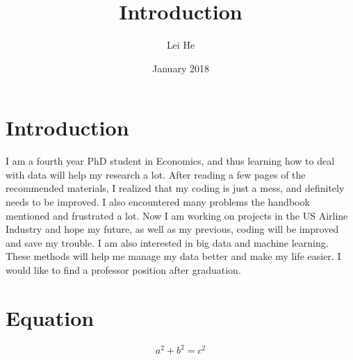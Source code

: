 \documentclass{article}
\title{Introduction}
\author{Lei He }
\date{January 2018}
\begin{document}
\maketitle

\section{Introduction}
I am a fourth year PhD student in Economics, and thus learning how to deal with data will help my research a lot. After reading a few pages of the recommended materials, I realized that my coding is just a mess, and definitely needs to be improved. I also encountered many problems the handbook mentioned and frustrated a lot. Now I am working on projects in the US Airline Industry and hope my future, as well as my previous, coding will be improved and save my trouble. I am also interested in big data and machine learning. These methods will help me manage my data better and make my life easier. I would like to find a professor position after graduation.

\section{Equation}
\begin{equation}
    a^2+b^2=c^2
\end{equation}
\end{document}
